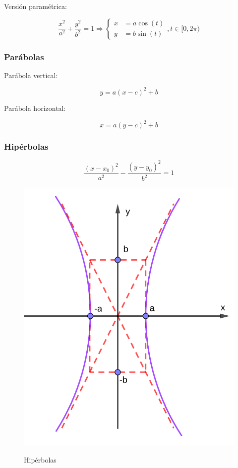 \documentclass{article}
\begin{document}
Versión paramétrica:

\begin{equation}
\frac{x^2}{a^2} + \frac{y^2}{b^2} = 1 \Rightarrow
\left\{
\begin{array}{ll}
x &= a \cos(t) \\
y &= b \sin(t)
\end{array}
\right., t \in [0, 2\pi)
\end{equation}

\subsubsection{Parábolas}

Parábola vertical:

\begin{equation}
y = a (x-c)^2 + b
\end{equation}

Parábola horizontal:

\begin{equation}
x = a (y-c)^2 + b
\end{equation}

\subsubsection{Hipérbolas}

\begin{equation}
\frac{(x-x_0)^2}{a^2} - \frac{(y-y_0)^2}{b^2} = 1
\end{equation}

\begin{figure}[ht]
\caption{Hipérbolas}
\includegraphics[scale=0.8]{img/teo_fig002_hiperbolas.png} 
\centering
\label{fig:hiperbolas}
\end{figure}
\end{document}
